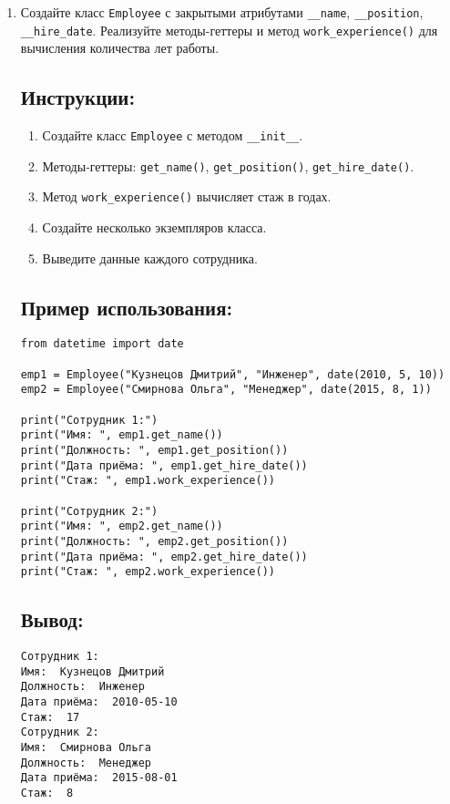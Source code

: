 \begin{enumerate}
\item
Создайте класс \texttt{Employee} с закрытыми атрибутами \texttt{\_\_name}, \texttt{\_\_position}, \texttt{\_\_hire\_date}. Реализуйте методы-геттеры и метод \texttt{work\_experience()} для вычисления количества лет работы.

\subsection*{Инструкции:}
\begin{enumerate}
    \item Создайте класс \texttt{Employee} с методом \texttt{\_\_init\_\_}.
    \item Методы-геттеры: \texttt{get\_name()}, \texttt{get\_position()}, \texttt{get\_hire\_date()}.
    \item Метод \texttt{work\_experience()} вычисляет стаж в годах.
    \item Создайте несколько экземпляров класса.
    \item Выведите данные каждого сотрудника.
\end{enumerate}

\subsection*{Пример использования:}
\begin{lstlisting}[caption=Пример кода]
from datetime import date

emp1 = Employee("Кузнецов Дмитрий", "Инженер", date(2010, 5, 10))
emp2 = Employee("Смирнова Ольга", "Менеджер", date(2015, 8, 1))

print("Сотрудник 1:")
print("Имя: ", emp1.get_name())
print("Должность: ", emp1.get_position())
print("Дата приёма: ", emp1.get_hire_date())
print("Стаж: ", emp1.work_experience())

print("Сотрудник 2:")
print("Имя: ", emp2.get_name())
print("Должность: ", emp2.get_position())
print("Дата приёма: ", emp2.get_hire_date())
print("Стаж: ", emp2.work_experience())
\end{lstlisting}

\subsection*{Вывод:}
\begin{lstlisting}[caption=Ожидаемый вывод]
Сотрудник 1:
Имя:  Кузнецов Дмитрий
Должность:  Инженер
Дата приёма:  2010-05-10
Стаж:  17
Сотрудник 2:
Имя:  Смирнова Ольга
Должность:  Менеджер
Дата приёма:  2015-08-01
Стаж:  8
\end{lstlisting}


\end{enumerate}
